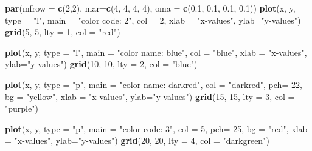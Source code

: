 \documentclass[
]{book}
\newenvironment{Shaded}{\begin{snugshade}}{\end{snugshade}}
\newcommand{\AttributeTok}[1]{\textcolor[rgb]{0.13,0.29,0.53}{#1}}
\newcommand{\DecValTok}[1]{\textcolor[rgb]{0.00,0.00,0.81}{#1}}
\newcommand{\FloatTok}[1]{\textcolor[rgb]{0.00,0.00,0.81}{#1}}
\newcommand{\FunctionTok}[1]{\textcolor[rgb]{0.13,0.29,0.53}{\textbf{#1}}}
\newcommand{\NormalTok}[1]{#1}
\newcommand{\StringTok}[1]{\textcolor[rgb]{0.31,0.60,0.02}{#1}}
\begin{document}
\begin{Shaded}
\begin{Highlighting}[]
\FunctionTok{par}\NormalTok{(}\AttributeTok{mfrow =} \FunctionTok{c}\NormalTok{(}\DecValTok{2}\NormalTok{,}\DecValTok{2}\NormalTok{), }\AttributeTok{mar=}\FunctionTok{c}\NormalTok{(}\DecValTok{4}\NormalTok{, }\DecValTok{4}\NormalTok{, }\DecValTok{4}\NormalTok{, }\DecValTok{4}\NormalTok{), }\AttributeTok{oma =} \FunctionTok{c}\NormalTok{(}\FloatTok{0.1}\NormalTok{, }\FloatTok{0.1}\NormalTok{, }\FloatTok{0.1}\NormalTok{, }\FloatTok{0.1}\NormalTok{))}
\FunctionTok{plot}\NormalTok{(x, y, }\AttributeTok{type =} \StringTok{"l"}\NormalTok{, }\AttributeTok{main =} \StringTok{"color code: 2"}\NormalTok{,  }\AttributeTok{col =} \DecValTok{2}\NormalTok{,         }
     \AttributeTok{xlab =} \StringTok{"x{-}values"}\NormalTok{, }\AttributeTok{ylab=}\StringTok{"y{-}values"}\NormalTok{)}
\FunctionTok{grid}\NormalTok{(}\DecValTok{5}\NormalTok{, }\DecValTok{5}\NormalTok{, }\AttributeTok{lty =} \DecValTok{1}\NormalTok{, }\AttributeTok{col =} \StringTok{"red"}\NormalTok{)}


\FunctionTok{plot}\NormalTok{(x, y, }\AttributeTok{type =} \StringTok{"l"}\NormalTok{, }\AttributeTok{main =} \StringTok{"color name: blue"}\NormalTok{,    }\AttributeTok{col =} \StringTok{"blue"}\NormalTok{,    }
     \AttributeTok{xlab =} \StringTok{"x{-}values"}\NormalTok{, }\AttributeTok{ylab=}\StringTok{"y{-}values"}\NormalTok{)}
\FunctionTok{grid}\NormalTok{(}\DecValTok{10}\NormalTok{, }\DecValTok{10}\NormalTok{, }\AttributeTok{lty =} \DecValTok{2}\NormalTok{, }\AttributeTok{col =} \StringTok{"blue"}\NormalTok{)}

\FunctionTok{plot}\NormalTok{(x, y, }\AttributeTok{type =} \StringTok{"p"}\NormalTok{, }\AttributeTok{main =} \StringTok{"color name: darkred"}\NormalTok{, }\AttributeTok{col =} \StringTok{"darkred"}\NormalTok{, }\AttributeTok{pch=} \DecValTok{22}\NormalTok{,  }
     \AttributeTok{bg =} \StringTok{"yellow"}\NormalTok{, }\AttributeTok{xlab =} \StringTok{"x{-}values"}\NormalTok{, }\AttributeTok{ylab=}\StringTok{"y{-}values"}\NormalTok{)}
\FunctionTok{grid}\NormalTok{(}\DecValTok{15}\NormalTok{, }\DecValTok{15}\NormalTok{, }\AttributeTok{lty =} \DecValTok{3}\NormalTok{, }\AttributeTok{col =} \StringTok{"purple"}\NormalTok{)}

\FunctionTok{plot}\NormalTok{(x, y, }\AttributeTok{type =} \StringTok{"p"}\NormalTok{, }\AttributeTok{main =} \StringTok{"color code: 3"}\NormalTok{,  }\AttributeTok{col =} \DecValTok{5}\NormalTok{, }\AttributeTok{pch=} \DecValTok{25}\NormalTok{,  }\AttributeTok{bg =} \StringTok{"red"}\NormalTok{,   }
     \AttributeTok{xlab =} \StringTok{"x{-}values"}\NormalTok{, }\AttributeTok{ylab=}\StringTok{"y{-}values"}\NormalTok{)}
\FunctionTok{grid}\NormalTok{(}\DecValTok{20}\NormalTok{, }\DecValTok{20}\NormalTok{, }\AttributeTok{lty =} \DecValTok{4}\NormalTok{, }\AttributeTok{col =} \StringTok{"darkgreen"}\NormalTok{)}
\end{Highlighting}
\end{Shaded}
\end{document}
